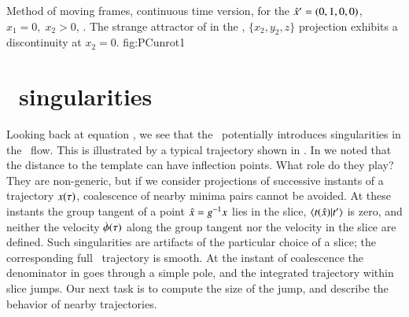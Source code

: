 {}{
Method of moving frames, continuous time version, for the
${\hat{x}'}=(0,1,0,0)$,
$x_1=0,\;x_2>0$, \slice. The strange attractor of
 in the \reducedsp,
$\{x_2,y_2,z\}$ projection exhibits a discontinuity at
$x_2=0$.
}
{fig:PCunrot1}
	
	
\section{\Slice\ singularities}
\label{sect:sliceSing}

Looking back at equation ,
we see that the \mslices\ potentially introduces singularities
in the \reducedsp\ flow.
This is illustrated by a typical trajectory
shown in .
%
In  we noted that the distance to the template
can have inflection points.
What role do they play? They are non-generic, but
if we consider projections of successive instants of a trajectory
$x(\tau)$, coalescence of
nearby minima pairs cannot be avoided.
At these instants the group tangent of a point
$\hat{x}=g^{-1} x$ lies in the slice, $\braket{\groupTan(\sspRed)}{\sliceTan{}}$ is zero,
and neither the velocity $\dot{{\bf \phi}}(\tau)$ along the group tangent
nor the velocity in the slice are defined.
Such singularities are artifacts of the particular choice of
a slice; the corresponding full \statesp\ trajectory is smooth. At the instant of coalescence
the denominator in  goes through a simple pole,
and the integrated trajectory within slice jumps. Our next task is
to compute the size of the jump, and describe the behavior of
nearby trajectories.


